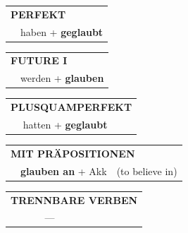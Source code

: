 \documentclass[10pt,a4paper]{revtex4-2}
\begin{document}
\begin{verbbox-dat}
    \vspace{10pt}

 \begin{tabular}{rl}
     \multicolumn{2}{l}{\textbf{PERFEKT}}\\
   & haben + \textbf{geglaubt}\\
  \end{tabular}
\hfill
   \begin{tabular}{rl}
   
    \multicolumn{2}{l}{\textbf{FUTURE I} }\\
   & werden + \textbf{glauben}\\
 
  \end{tabular}
\hfill
   \begin{tabular}{rl}
      \multicolumn{2}{l}{\textbf{PLUSQUAMPERFEKT}}\\
   & hatten + \textbf{geglaubt}\\
  \end{tabular}
  
\vspace{10pt}

\begin{tabular}{lll}
\multicolumn{3}{l}{\textbf{MIT PRÄPOSITIONEN}}\\
& \textbf{glauben an} + Akk & (to believe in)\\
\end{tabular}
\hfill
\begin{tabular}{lll}
\multicolumn{3}{l}{\textbf{TRENNBARE VERBEN}}\\
& --- & \\
\end{tabular}

  \vspace{-5pt}


\end{verbbox-dat}
\end{document}
